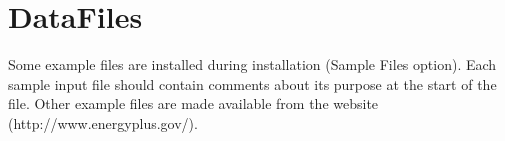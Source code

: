 \section{DataFiles}\label{datafiles}

Some example files are installed during installation (Sample Files option). Each sample input file should contain comments about its purpose at the start of the file. Other example files are made available from the website (http://www.energyplus.gov/).
